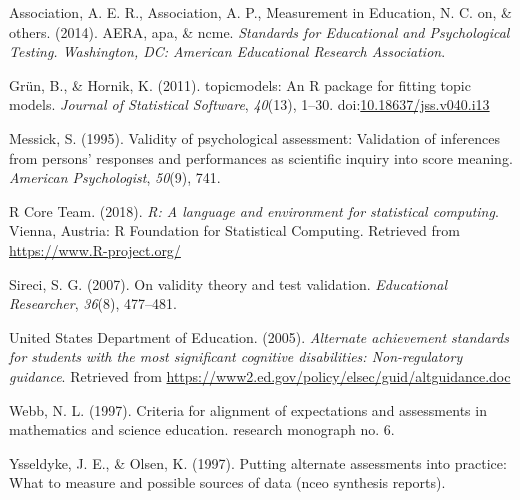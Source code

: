 \documentclass[doc]{apa6}
\theoremstyle{definition}
\theoremstyle{definition}
\theoremstyle{definition}
\theoremstyle{remark}
\begin{document}
\hypertarget{refs}{}
\hypertarget{ref-standards14}{}
Association, A. E. R., Association, A. P., Measurement in Education, N.
C. on, \& others. (2014). AERA, apa, \& ncme. \emph{Standards for
Educational and Psychological Testing. Washington, DC: American
Educational Research Association}.

\hypertarget{ref-grun11}{}
Grün, B., \& Hornik, K. (2011). topicmodels: An R package for fitting
topic models. \emph{Journal of Statistical Software}, \emph{40}(13),
1--30.
doi:\href{https://doi.org/10.18637/jss.v040.i13}{10.18637/jss.v040.i13}

\hypertarget{ref-messick95}{}
Messick, S. (1995). Validity of psychological assessment: Validation of
inferences from persons' responses and performances as scientific
inquiry into score meaning. \emph{American Psychologist}, \emph{50}(9),
741.

\hypertarget{ref-r}{}
R Core Team. (2018). \emph{R: A language and environment for statistical
computing}. Vienna, Austria: R Foundation for Statistical Computing.
Retrieved from \url{https://www.R-project.org/}

\hypertarget{ref-sireci07}{}
Sireci, S. G. (2007). On validity theory and test validation.
\emph{Educational Researcher}, \emph{36}(8), 477--481.

\hypertarget{ref-usdoe05}{}
United States Department of Education. (2005). \emph{Alternate
achievement standards for students with the most significant cognitive
disabilities: Non-regulatory guidance}. Retrieved from
\url{https://www2.ed.gov/policy/elsec/guid/altguidance.doc}

\hypertarget{ref-webb97}{}
Webb, N. L. (1997). Criteria for alignment of expectations and
assessments in mathematics and science education. research monograph no.
6.

\hypertarget{ref-ysseldyke97}{}
Ysseldyke, J. E., \& Olsen, K. (1997). Putting alternate assessments
into practice: What to measure and possible sources of data (nceo
synthesis reports).
\end{document}
